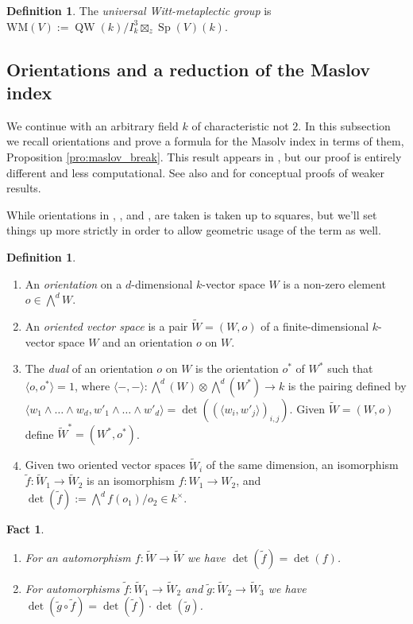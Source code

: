 \documentclass{article}
\def\<{\langle}
\def\>{\rangle}
\def\Wedge{\bigwedge}
\DeclareMathOperator{\Sp}{Sp}
\newtheorem{fct}[thm]{Fact}
\theoremstyle{definition}
\newtheorem{dfn}[thm]{Definition}
\numberwithin{equation}{subsection}
\renewcommand{\-}{\hyp{}}
\newcommand{\WMuniv}{\mathrm{WM}}
\DeclareMathOperator{\QW}{QW}
\begin{document}
\begin{appendices}
\begin{dfn} \label{dfn:meta_univ} The \emph{universal Witt-metaplectic group} is $\WMuniv(V) := \QW(k)/I_k^3 \boxtimes_z \Sp(V)(k)$.\index[notation]{WM@$\WMuniv$}
\end{dfn}


\subsection{Orientations and a reduction of the Maslov index}

We continue with an arbitrary field $k$ of characteristic not $2$. In this subsection we recall orientations and prove a formula for the Masolv index in terms of them, Proposition \ref{pro:maslov_break}. This result appears in \cite[Proposition 2.1]{Parimala2000}, but our proof is entirely different and less computational. See also \cite[Theorem 1.7.6]{LionVergne} and \cite[Theorem A.15]{LionVergne} for conceptual proofs of weaker results.

While orientations in \cite{LionVergne}, \cite{Parimala2000}, and \cite{Thomas2013}, are taken is taken up to squares, but we'll set things up more strictly in order to allow geometric usage of the term as well.

\begin{dfn}
	\begin{enumerate}
		\item An \emph{orientation} on a $d$-dimensional $k$-vector space $W$ is a non-zero element $o \in \Wedge^dW$.
		\item An \emph{oriented vector space} is a pair $\tilde W=(W,o)$ of a finite-dimensional $k$-vector space $W$ and an orientation $o$ on $W$.
		\item The \emph{dual} of an orientation $o$ on $W$ is the orientation $o^*$ of $W^*$ such that $\<o,o^*\>=1$, where $\<-,-\> : \Wedge^d(W) \otimes \Wedge^d(W^*) \to k$ is the pairing defined by $\<w_1\wedge \dots \wedge w_d,w'_1 \wedge \dots \wedge w'_d\>=\det((\<w_i,w'_j\>)_{i,j})$. Given $\tilde W=(W,o)$ define $\tilde W^*=(W^*,o^*)$.
		\item Given two oriented vector spaces $\tilde W_i$ of the same dimension, an isomorphism $\tilde f : \tilde W_1 \to \tilde W_2$ is an isomorphism $f : W_1 \to W_2$, and $\det(\tilde f):=\Wedge^d f(o_1)/o_2 \in k^\times$.
	\end{enumerate}
\end{dfn}

\begin{fct}
	\begin{enumerate}
		\item For an automorphism $f : \tilde W \to\tilde W$ we have $\det(\tilde f)=\det(f)$.
		\item For automorphisms $\tilde f : \tilde W_1 \to \tilde W_2$ and $\tilde g : \tilde W_2 \to \tilde W_3$ we have $\det(\tilde g\circ \tilde f)=\det(\tilde f)\cdot \det(\tilde g)$.
	\end{enumerate}
\end{fct}


\end{appendices}
\end{document}
